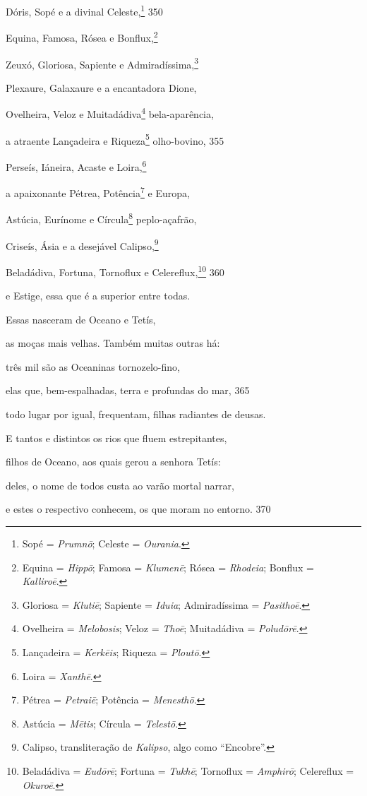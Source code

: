 Dóris, Sopé e a divinal Celeste,\footnote{Sopé = \emph{Prumnō}; Celeste = \emph{Ourania}.} \num{350}

Equina, Famosa, Rósea e Bonflux,\footnote{Equina = \emph{Hippō}; Famosa = \emph{Klumenē}; Rósea = \emph{Rhodeia}; Bonflux = \emph{Kalliroē}.}

Zeuxó, Gloriosa, Sapiente e Admiradíssima,\footnote{Gloriosa = \emph{Klutiē}; Sapiente = \emph{Iduia}; Admiradíssima =
\emph{Pasithoē}.}

Plexaure, Galaxaure e a encantadora Dione,

Ovelheira, Veloz e Muitadádiva\footnote{Ovelheira = \emph{Melobosis}; Veloz = \emph{Thoē}; Muitadádiva = \emph{Poludōrē}.} bela-aparência,

a atraente Lançadeira e Riqueza\footnote{Lançadeira = \emph{Kerkēis}; Riqueza = \emph{Ploutō}.} olho-bovino, \num{355}

Perseís, Iáneira, Acaste e Loira,\footnote{Loira = \emph{Xanthē}.}

a apaixonante Pétrea, Potência\footnote{Pétrea = \emph{Petraiē}; Potência = \emph{Menesthō}.} e Europa,

Astúcia, Eurínome e Círcula\footnote{Astúcia = \emph{Mētis}; Círcula = \emph{Telestō}.} peplo-açafrão,

Criseís, Ásia e a desejável Calipso,\footnote{Calipso, transliteração de \emph{Kalipso}, algo como ``Encobre''.}

Beladádiva, Fortuna, Tornoflux e Celereflux,\footnote{Beladádiva = \emph{Eudōrē}; Fortuna = \emph{Tukhē}; Tornoflux =
\emph{Amphirō}; Celereflux = \emph{Okuroē}.} \num{360}

e Estige, essa que é a superior entre todas.

Essas nasceram de Oceano e Tetís,

as moças mais velhas. Também muitas outras há:

três mil são as Oceaninas tornozelo-fino,

elas que, bem-espalhadas, terra e profundas do mar, \num{365}

todo lugar por igual, frequentam, filhas radiantes de deusas.

E tantos e distintos os rios que fluem estrepitantes,

filhos de Oceano, aos quais gerou a senhora Tetís:

deles, o nome de todos custa ao varão mortal narrar,

e estes o respectivo conhecem, os que moram no entorno. \num{370}

